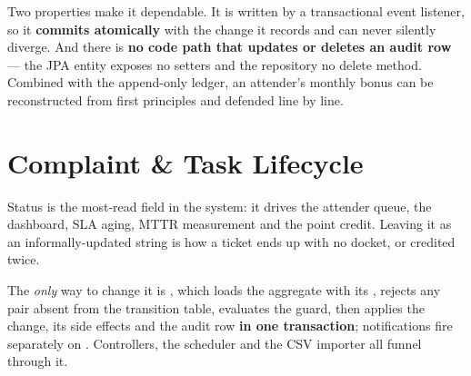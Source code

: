 \documentclass[10pt,a4paper]{article}
\begin{document}
Two properties make it dependable. It is written by a  transactional event
listener, so it \textbf{commits atomically} with the change it records and can never silently
diverge. And there is \textbf{no code path that updates or deletes an audit row} --- the JPA entity
exposes no setters and the repository no delete method. Combined with the append-only ledger, an
attender's monthly bonus can be reconstructed from first principles and defended line by line.

\section{Complaint \& Task Lifecycle}

Status is the most-read field in the system: it drives the attender queue, the dashboard, SLA
aging, MTTR measurement and the point credit. Leaving it as an informally-updated string is how a
ticket ends up  with no docket, or credited twice.

The \emph{only} way to change it is
, which loads the aggregate with its
, rejects any  pair absent from the transition table, evaluates
the guard, then applies the change, its side effects and the audit row \textbf{in one transaction};
notifications fire separately on . Controllers, the scheduler and the CSV importer all funnel through it.
\end{document}
